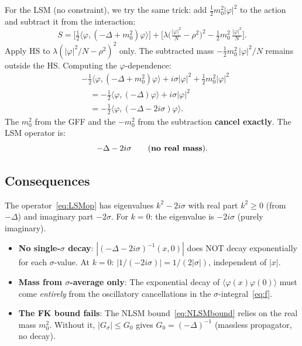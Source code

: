 \documentclass[12pt]{article}
\theoremstyle{definition}
\theoremstyle{remark}
\newcommand{\ph}{\varphi}
\begin{document}
For the LSM (no constraint), we try the same trick: add
$\tfrac{1}{2}m_0^2|\ph|^2$ to the action and subtract it from
the interaction:
\begin{equation}
  S = \bigl[\tfrac{1}{2}\langle\ph,(-\Delta+m_0^2)\ph\rangle\bigr]
    + \bigl[\lambda\bigl(\tfrac{|\ph|^2}{N}-\rho^2\bigr)^2
      - \tfrac{1}{2}m_0^2\,\tfrac{|\ph|^2}{N}\bigr].
\end{equation}
Apply HS to $\lambda(|\ph|^2/N-\rho^2)^2$ only. The subtracted mass
$-\tfrac{1}{2}m_0^2\,|\ph|^2/N$ remains outside the HS. Computing the
$\ph$-dependence:
\begin{align}
  &-\tfrac{1}{2}\langle\ph,(-\Delta+m_0^2)\ph\rangle
    + i\sigma|\ph|^2 + \tfrac{1}{2}m_0^2|\ph|^2 \nonumber\\
  &\quad= -\tfrac{1}{2}\langle\ph,(-\Delta)\ph\rangle + i\sigma|\ph|^2
    \nonumber\\
  &\quad= -\tfrac{1}{2}\langle\ph,(-\Delta - 2i\sigma)\ph\rangle.
\end{align}
The $m_0^2$ from the GFF and the $-m_0^2$ from the subtraction
\textbf{cancel exactly}. The LSM operator is:
\begin{equation}
\label{eq:LSMop}
  -\Delta - 2i\sigma \qquad\text{(\textbf{no real mass})}.
\end{equation}

\subsection{Consequences}

The operator~\eqref{eq:LSMop} has eigenvalues $k^2 - 2i\sigma$
with real part $k^2 \ge 0$ (from $-\Delta$) and imaginary part
$-2\sigma$. For $k = 0$: the eigenvalue is $-2i\sigma$ (purely
imaginary).

\begin{itemize}
\item \textbf{No single-$\sigma$ decay}: $|(-\Delta-2i\sigma)^{-1}(x,0)|$
  does NOT decay exponentially for each $\sigma$-value. At $k=0$:
  $|1/(-2i\sigma)| = 1/(2|\sigma|)$, independent of $|x|$.
\item \textbf{Mass from $\sigma$-average only}: The exponential decay
  of $\langle\ph(x)\ph(0)\rangle$ must come \emph{entirely} from the
  oscillatory cancellations in the $\sigma$-integral~\eqref{eq:f}.
\item \textbf{The FK bound fails}: The NLSM bound~\eqref{eq:NLSMbound}
  relies on the real mass $m_0^2$. Without it, $|G_\sigma| \le G_0$
  gives $G_0 = (-\Delta)^{-1}$ (massless propagator, no decay).
\end{itemize}
\end{document}
